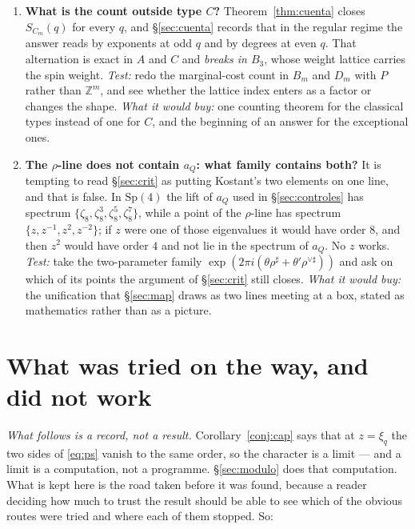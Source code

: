 \documentclass[11pt,a4paper]{article}
\theoremstyle{definition}
\newcommand{\Sp}{\mathrm{Sp}}
\newcommand{\ZZ}{\mathbb{Z}}
\begin{document}
\begin{enumerate}
\item \textbf{What is the count outside type $C$?}
Theorem~\ref{thm:cuenta} closes $S_{C_m}(q)$ for every $q$, and \S\ref{sec:cuenta} records that in
the regular regime the answer reads by exponents at odd $q$ and by degrees at even $q$. That
alternation is exact in $A$ and $C$ and \emph{breaks in $B_3$}, whose weight lattice carries the
spin weight. \emph{Test:} redo the marginal-cost count in $B_m$ and $D_m$ with $P$ rather than
$\ZZ^m$, and see whether the lattice index enters as a factor or changes the shape.
\emph{What it would buy:} one counting theorem for the classical types instead of one for $C$, and
the beginning of an answer for the exceptional ones.

\item \textbf{The $\rho$-line does not contain $a_Q$: what family contains both?}
It is tempting to read \S\ref{sec:crit} as putting Kostant's two elements on one line, and that is
false. In $\Sp(4)$ the lift of $a_Q$ used in \S\ref{sec:controles} has spectrum
$\{\zeta_8,\zeta_8^3,\zeta_8^5,\zeta_8^7\}$, while a point of the $\rho$-line has spectrum
$\{z,z^{-1},z^2,z^{-2}\}$; if $z$ were one of those eigenvalues it would have order $8$, and then
$z^2$ would have order $4$ and not lie in the spectrum of $a_Q$. No $z$ works. \emph{Test:} take the
two-parameter family $\exp(2\pi i(\theta\rho^\sharp+\theta'\rho^{\vee\sharp}))$ and ask on which of
its points the argument of \S\ref{sec:crit} still closes. \emph{What it would buy:} the unification
that \S\ref{sec:map} draws as two lines meeting at a box, stated as mathematics rather than as a
picture.

\end{enumerate}

\appendix
\section{What was tried on the way, and did not work}\label{sec:cierre}

\noindent \emph{What follows is a record, not a result.} Corollary~\ref{conj:cap} says that at
$z=\xi_q$ the two sides of \eqref{eq:ps} vanish to the same order, so the character is a limit
--- and a limit is a computation, not a programme. \S\ref{sec:modulo} does that computation.
What is kept here is the road taken before it was found, because a reader deciding how much to
trust the result should be able to see which of the obvious routes were tried and where each
of them stopped. So:
\end{document}
